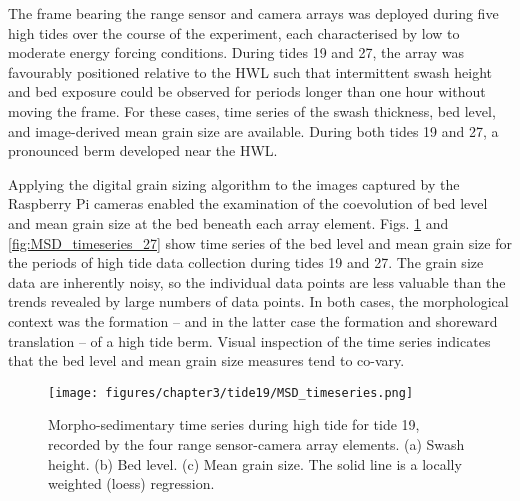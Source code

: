 The frame bearing the range sensor and camera arrays was deployed during five high tides over the course of the experiment, each characterised by low to moderate energy forcing conditions. During tides 19 and 27, the array was favourably positioned relative to the HWL such that intermittent swash height and bed exposure could be observed for periods longer than one hour without moving the frame. For these cases, time series of the swash thickness, bed level, and image-derived mean grain size are available. During both tides 19 and 27, a pronounced berm developed near the HWL.

Applying the digital grain sizing algorithm to the images captured by the Raspberry Pi cameras enabled the examination of the coevolution of bed level and mean grain size at the bed beneath each array element. Figs. \ref{fig:MSD_timeseries_19} and \ref{fig:MSD_timeseries_27} show time series of the bed level and mean grain size for the periods of high tide data collection during tides 19 and 27. The grain size data are inherently noisy, so the individual data points are less valuable than the trends revealed by large numbers of data points. In both cases, the morphological context was the formation -- and in the latter case the formation and shoreward translation -- of a high tide berm. Visual inspection of the time series indicates that the bed level and mean grain size measures tend to co-vary. 

\begin{figure}[tbp] %
  	\texttt{[image: figures/chapter3/tide19/MSD\_timeseries.png]}
  	\caption[Time series of swash zone bed level and mean grain size, tide 19]{Morpho-sedimentary time series during high tide for tide 19, recorded by the four range sensor-camera array elements. (a) Swash height. (b) Bed level. (c) Mean grain size. The solid line is a locally weighted (loess) regression.}
 	\label{fig:MSD_timeseries_19}
\end{figure}

